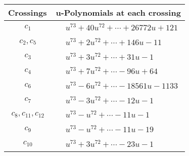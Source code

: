 \documentclass[1p]{elsarticle_modified}
\theoremstyle{definition}
\begin{document}
\begin{tabular}{m{50pt}|m{274pt}}
Crossings & \hspace{64pt}u-Polynomials at each crossing \\
\hline $$\begin{aligned}c_{1}\end{aligned}$$&$\begin{aligned}
&u^{73}+40 u^{72}+\cdots+26772 u+121
\end{aligned}$\\
\hline $$\begin{aligned}c_{2},c_{5}\end{aligned}$$&$\begin{aligned}
&u^{73}+2 u^{72}+\cdots+146 u-11
\end{aligned}$\\
\hline $$\begin{aligned}c_{3}\end{aligned}$$&$\begin{aligned}
&u^{73}+3 u^{72}+\cdots+31 u-1
\end{aligned}$\\
\hline $$\begin{aligned}c_{4}\end{aligned}$$&$\begin{aligned}
&u^{73}+7 u^{72}+\cdots-96 u+64
\end{aligned}$\\
\hline $$\begin{aligned}c_{6}\end{aligned}$$&$\begin{aligned}
&u^{73}-6 u^{72}+\cdots-18561 u-1133
\end{aligned}$\\
\hline $$\begin{aligned}c_{7}\end{aligned}$$&$\begin{aligned}
&u^{73}-3 u^{72}+\cdots-12 u-1
\end{aligned}$\\
\hline $$\begin{aligned}c_{8},c_{11},c_{12}\end{aligned}$$&$\begin{aligned}
&u^{73}- u^{72}+\cdots-11 u-1
\end{aligned}$\\
\hline $$\begin{aligned}c_{9}\end{aligned}$$&$\begin{aligned}
&u^{73}- u^{72}+\cdots-11 u-19
\end{aligned}$\\
\hline $$\begin{aligned}c_{10}\end{aligned}$$&$\begin{aligned}
&u^{73}+3 u^{72}+\cdots-23 u-1
\end{aligned}$\\
\hline
\end{tabular}\\~\\
\end{document}
